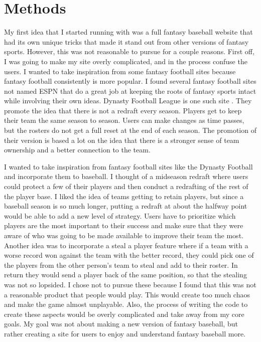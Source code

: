 \documentclass[10pt,twocolumn]{article}
\begin{document}
\section{Methods}
	My first idea that I started running with was a full fantasy baseball website that had its own unique tricks that made it stand out from other versions of fantasy sports. However, this was not reasonable to pursue for a couple reasons. First off, I was going to make my site overly complicated, and in the process confuse the users. I wanted to take inspiration from some fantasy football sites because fantasy football consistently is more popular. I found several fantasy football sites not named ESPN that do a great job at keeping the roots of fantasy sports intact while involving their own ideas. Dynasty Football League is one such site \cite{Dynasty League}. They promote the idea that there is not a redraft every season. Players get to keep their team the same season to season. Users can make changes as time passes, but the rosters do not get a full reset at the end of each season. The promotion of their version is based a lot on the idea that there is a stronger sense of team ownership and a better connection to the team. 
	
	  I wanted to take inspiration from fantasy football sites like the Dynasty Football and incorporate them to baseball. I thought of a midseason redraft where users could protect a few of their players and then conduct a redrafting of the rest of the player base. I liked the idea of teams getting to retain players, but since a baseball season is so much longer, putting a redraft at about the halfway point would be able to add a new level of strategy. Users have to prioritize which players are the most important to their success and make sure that they were aware of who was going to be made available to improve their team the most. Another idea was to incorporate a steal a player feature where if a team with a worse record won against the team with the better record, they could pick one of the players from the other person's team to steal and add to their roster. In return they would send a player back of the same position, so that the stealing was not so lopsided. I chose not to pursue these because I found that this was not a reasonable product that people would play. This would create too much chaos and make the game almost unplayable. Also, the process of writing the code to create these aspects would be overly complicated and take away from my core goals. My goal was not about making a new version of fantasy baseball, but rather creating a site for users to enjoy and understand fantasy baseball more.
	
\end{document}
